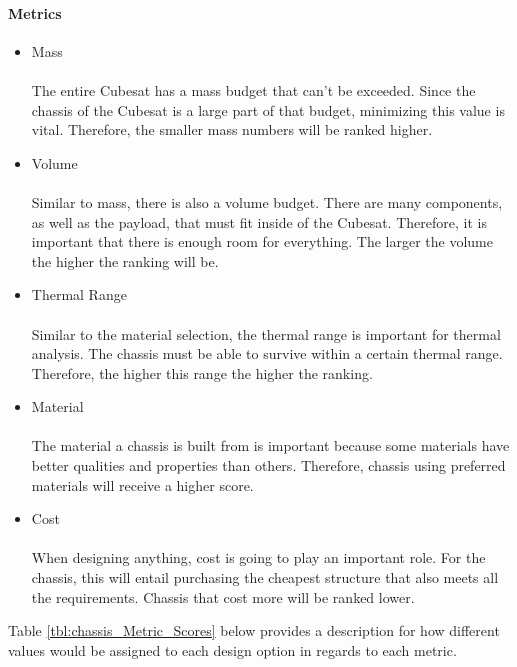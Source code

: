\paragraph{Metrics}
\begin{itemize}
\item{Mass}\\
\\
The entire Cubesat has a mass budget that can't be exceeded. Since the chassis of the Cubesat is a large part of that budget, minimizing this value is vital. Therefore, the smaller mass numbers will be ranked higher. 
\item{Volume}\\
\\
Similar to mass, there is also a volume budget. There are many components, as well as the payload, that must fit inside of the Cubesat. Therefore, it is important that there is enough room for everything. The larger the volume the higher the ranking will be.
\item{Thermal Range}\\
\\
Similar to the material selection, the thermal range is important for thermal analysis. The chassis must be able to survive within a certain thermal range. Therefore, the higher this range the higher the ranking.
\item{Material}\\
\\
The material a chassis is built from is important because some materials have better qualities and properties than others. Therefore, chassis using preferred materials will receive a higher score. 
\item{Cost}\\
\\
When designing anything, cost is going to play an important role. For the chassis, this will entail purchasing the cheapest structure that also meets all the requirements. Chassis that cost more will be ranked lower.
\end{itemize}

Table \ref{tbl:chassis_Metric_Scores} below provides a description for how different values would be assigned to each design option in regards to each metric. 

